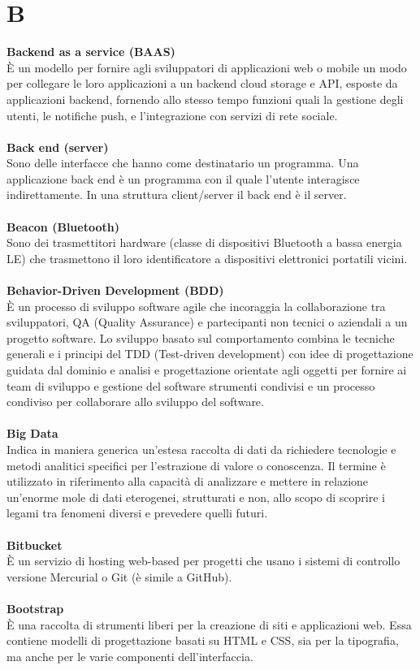 \section{B}
\textbf{Backend as a service (BAAS)}\\
È un modello per fornire agli sviluppatori di applicazioni web o mobile un modo per collegare le loro applicazioni a un backend cloud storage e API, esposte da applicazioni backend, fornendo allo stesso tempo funzioni quali la gestione degli utenti, le notifiche push, e l'integrazione con servizi di rete sociale. \\ \\
\textbf{Back end (server)}\\
Sono delle interfacce che hanno come destinatario un programma. Una applicazione back end è un programma con il quale l'utente interagisce indirettamente. In una struttura client/server il back end è il server. \\ \\
\textbf{Beacon (Bluetooth)}\\
Sono dei trasmettitori hardware (classe di dispositivi Bluetooth a bassa energia LE) che trasmettono il loro identificatore a dispositivi elettronici portatili vicini. \\ \\
\textbf{Behavior-Driven Development (BDD)}\\
È un processo di sviluppo software agile che incoraggia la collaborazione tra sviluppatori, QA (Quality Assurance) e partecipanti non tecnici o aziendali a un progetto software. Lo sviluppo basato sul comportamento combina le tecniche generali e i principi del TDD (Test-driven development) con idee di progettazione guidata dal dominio e analisi e progettazione orientate agli oggetti per fornire ai team di sviluppo e gestione del software strumenti condivisi e un processo condiviso per collaborare allo sviluppo del software. \\ \\
\textbf{Big Data}\\
Indica in maniera generica un'estesa raccolta di dati da richiedere tecnologie e metodi analitici specifici per l'estrazione di valore o conoscenza. Il termine è utilizzato in riferimento alla capacità di analizzare  e mettere in relazione un'enorme mole di dati eterogenei, strutturati e non, allo scopo di scoprire i legami tra fenomeni diversi e prevedere quelli futuri. \\ \\
\textbf{Bitbucket}\\
È un servizio di hosting web-based per progetti che usano i sistemi di controllo versione Mercurial o Git (è simile a GitHub). \\ \\
\textbf{Bootstrap}\\
È una raccolta di strumenti liberi per la creazione di siti e applicazioni web. Essa contiene modelli di progettazione basati su HTML e CSS, sia per la tipografia, ma anche per le varie componenti dell'interfaccia. \\ \\
\clearpage